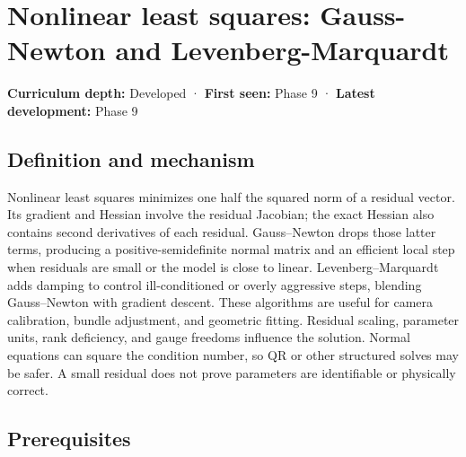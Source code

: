 \hypertarget{appendix-2c2df8345991}{}\label{referencestart:appendix-2c2df8345991}
\section{Nonlinear least squares: Gauss-Newton and Levenberg-Marquardt}\label{appendix-2c2df8345991-nonlinear-least-squares-gauss-newton-and-levenberg-marquardt}

\hypertarget{appendix-2c2df8345991-nonlinear-least-squares-gauss-newton-and-levenberg-marquardt}{}

\textbf{Curriculum depth:} Developed · \textbf{First seen:} Phase 9 · \textbf{Latest development:} Phase 9

\begin{allmightroledefinition}

\subsection{Definition and mechanism}\label{appendix-2c2df8345991-definition-and-mechanism}

\hypertarget{appendix-2c2df8345991-definition-and-mechanism}{}

Nonlinear least squares minimizes one half the squared norm of a residual vector. Its gradient and Hessian involve the residual Jacobian; the exact Hessian also contains second derivatives of each residual. Gauss--Newton drops those latter terms, producing a positive-semidefinite normal matrix and an efficient local step when residuals are small or the model is close to linear. Levenberg--Marquardt adds damping to control ill-conditioned or overly aggressive steps, blending Gauss--Newton with gradient descent. These algorithms are useful for camera calibration, bundle adjustment, and geometric fitting. Residual scaling, parameter units, rank deficiency, and gauge freedoms influence the solution. Normal equations can square the condition number, so QR or other structured solves may be safer. A small residual does not prove parameters are identifiable or physically correct.

\end{allmightroledefinition}

\subsection{Prerequisites}\label{appendix-2c2df8345991-prerequisites}

\hypertarget{appendix-2c2df8345991-prerequisites}{}

